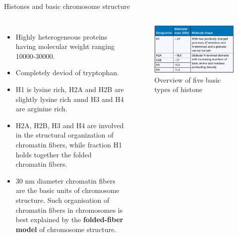 \documentclass[11pt,dvipsnames,ignorenonframetext,aspectratio=169]{beamer}
\providecommand{\tightlist}{%
  \setlength{\itemsep}{0pt}\setlength{\parskip}{0pt}}
\newcommand{\bcolumns}{\begin{columns}[T, onlytextwidth]}
\newcommand{\ecolumns}{\end{columns}}
\begin{document}
\begin{frame}{Histones and basic chromosome structure}
\protect\hypertarget{histones-and-basic-chromosome-structure}{}
\bcolumns
{}
\footnotesize

\begin{itemize}
\tightlist
\item
  Highly heterogeneous proteins having molecular weight ranging
  10000-30000.
\item
  Completely deviod of tryptophan.
\item
  H1 is lysine rich, H2A and H2B are slightly lysine rich annd H3 and H4
  are arginine rich.
\item
  H2A, H2B, H3 and H4 are involved in the structural organization of
  chromatin fibers, while fraction H1 holds together the folded
  chromatin fibers.
\item
  30 nm diameter chromatin fibers are the basic units of chromosome
  structure. Such organisation of chromatin fibers in chromosomes is
  best explained by the \textbf{folded-fiber model} of chromosome
  structure.
\end{itemize}


\begin{figure}
\includegraphics[width=0.9\linewidth]{../images/histone_types} \caption{Overview of five basic types of histone}\label{fig:histone-types}
\end{figure}

\ecolumns
\end{frame}
\end{document}
